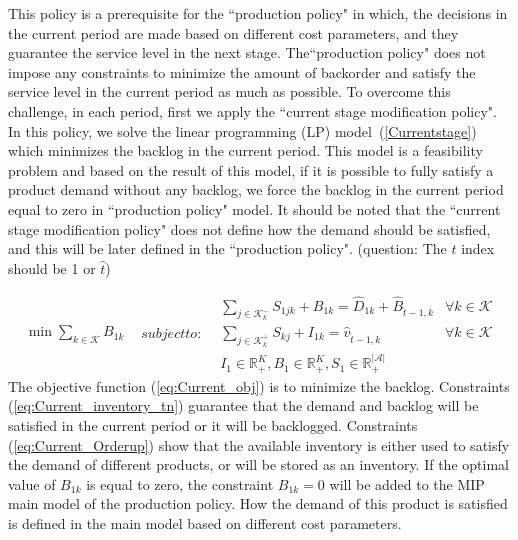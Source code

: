 \documentclass[10pt]{article}
\newcommand{\ti}{t} %
\newcommand{\ka}{k} %
\newcommand{\KA}{\mathcal{K}}
\newcommand{\Ka}{K}
\newcommand{\jey}{j} %
\newcommand{\Graf}{\mathcal{A}} %
\newcommand{\Csub}{\mathcal{K}^+_k}
\newcommand{\Psub}{\mathcal{K}^-_k}
\newcommand{\tAct}{\hat{\ti}} %
\newcommand{\cred}{\color{red!65!black}}
\begin{document}
This policy is a prerequisite for the ``production policy" in which, the decisions in the current period are made based on different cost parameters, and they guarantee the service level in the next stage. The``production policy" does not impose any constraints to minimize the amount of backorder and satisfy the service level in the current period as much as possible. 
To overcome this challenge, in each period, first we apply the ``current stage modification policy". In this policy, we solve the linear programming (LP) model~(\ref{Currentstage}) which minimizes the backlog in the current period.
{\cred This model is a feasibility problem and based on the result of this model, if it is possible to fully satisfy a product demand without any backlog, we force the backlog in the current period equal to zero in ``production policy" model.} It should be noted that the ``current stage modification policy" does not define how the demand should be satisfied, and this will be later defined in the ``production policy".
(question: The $\ti$ index should be 1 or $\tAct$)


\begin{subequations}
\label{Currentstage}

\begin{flalign}
&\min  \sum_{\ka \in \KA}  {B}_{ 1 \ka} & \label{eq:Current_obj} 
\end{flalign}
 subject to:
\begin{flalign}
  &  \sum_{\jey \in  \Psub} {S}_{1  \jey \ka} + B_{1 \ka}  = \hat{D}_{1 \ka} + \hat{B}_{\tAct-1, \ka} &\forall \ka \in \KA  &     \label{eq:Current_inventory_tn}&\\
&  \sum_{\jey \in  \Csub} {S}_{ \ka \jey} + I_{ 1 \ka} = \hat{v}_{ \tAct-1, \ka} &\forall \ka \in \KA  &     \label{eq:Current_Orderup}&\\
& {I}_{ 1 } \in \mathbb{R}_{+}^{\Ka} , {B}_{ 1 } \in \mathbb{R}_{+}^{\Ka} , {S}_{1} \in \mathbb{R}_{+}^{|\Graf|} &    & \label{eq:Current_bound2}
\end{flalign}
\end{subequations}
The objective function (\ref{eq:Current_obj}) is to minimize the backlog. Constraints (\ref{eq:Current_inventory_tn}) guarantee that the demand and backlog will be satisfied in the current period or it will be backlogged. Constraints (\ref{eq:Current_Orderup}) show that the available inventory is either used to satisfy the demand of different products, or will be stored as an inventory.
If the optimal value of  $B_{ 1 \ka}$  is equal to zero, the constraint $B_{ 1 \ka} = 0$ will be added to the MIP main model of the production policy. How the demand of this product is satisfied is defined in the main model based on different cost parameters.
\end{document}
